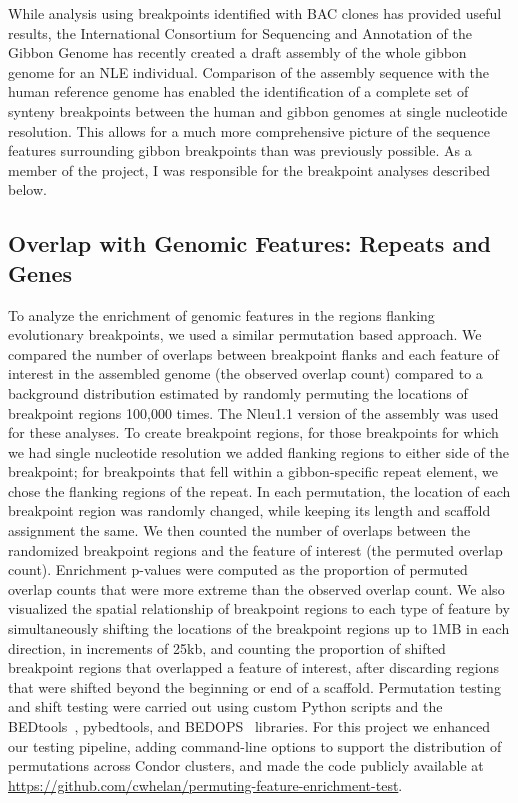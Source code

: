 While analysis using breakpoints identified with BAC clones has provided useful results, the International Consortium for Sequencing and Annotation of the Gibbon Genome has recently created a draft assembly of the whole gibbon genome for an NLE individual. Comparison of the assembly sequence with the human reference genome has enabled the identification of a complete set of synteny breakpoints between the human and gibbon genomes at single nucleotide resolution. This allows for a much more comprehensive picture of the sequence features surrounding gibbon breakpoints than was previously possible. As a member of the project, I was responsible for the breakpoint analyses described below.

\subsection{Overlap with Genomic Features: Repeats and Genes}

To analyze the enrichment of genomic features in the regions flanking evolutionary breakpoints, we used a similar permutation based approach. We compared the number of overlaps between breakpoint flanks and each feature of interest in the assembled genome (the observed overlap count) compared to a background distribution estimated by randomly permuting the locations of breakpoint regions 100,000 times. The Nleu1.1 version of the assembly was used for these analyses. To create breakpoint regions, for those breakpoints for which we had single nucleotide resolution we added flanking regions to either side of the breakpoint; for breakpoints that fell within a gibbon-specific repeat element, we chose the flanking regions of the repeat. In each permutation, the location of each breakpoint region was randomly changed, while keeping its length and scaffold assignment the same. We then counted the number of overlaps between the randomized breakpoint regions and the feature of interest (the permuted overlap count). Enrichment p-values were computed as the proportion of permuted overlap counts that were more extreme than the observed overlap count. We also visualized the spatial relationship of breakpoint regions to each type of feature by simultaneously shifting the locations of the breakpoint regions up to 1MB in each direction, in increments of 25kb, and counting the proportion of shifted breakpoint regions that overlapped a feature of interest, after discarding regions that were shifted beyond the beginning or end of a scaffold. Permutation testing and shift testing were carried out using custom Python scripts and the BEDtools~\cite{Quinlan:2010km}, pybedtools\cite{Dale:2011cl}, and BEDOPS~\cite{Neph:2012kq} libraries. For this project we enhanced our testing pipeline, adding command-line options to support the distribution of permutations across Condor clusters, and made the code publicly available at \url{https://github.com/cwhelan/permuting-feature-enrichment-test}.

